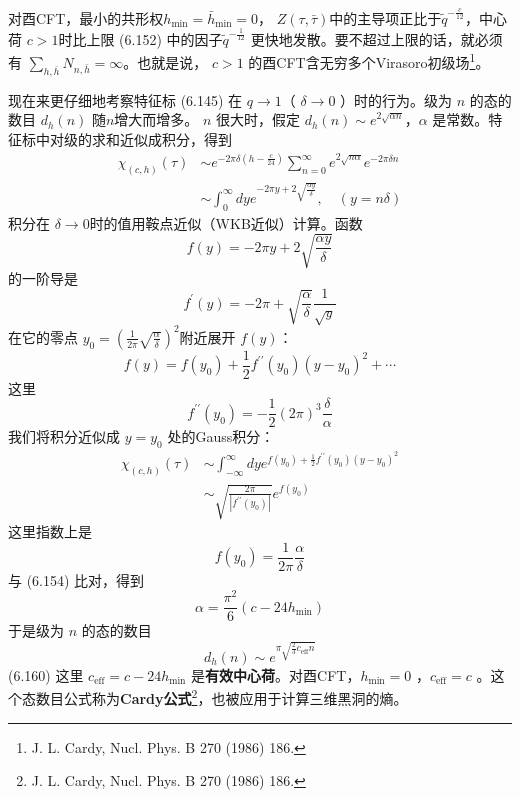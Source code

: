 对酉CFT，最小的共形权$ h_{\min }=\bar{h}_{\min }=0 $， $Z(\tau, \bar{\tau}) $中的主导项正比于$ \tilde{q}^{-\frac{c}{12}} $，中心荷 $c>1 $时比上限 (6.152) 中的因子$ \tilde{q}^{-\frac{1}{12}}$ 更快地发散。要不超过上限的话，就必须有 $\sum_{h, \bar{h}} N_{n, \bar{h}}=\infty $。也就是说， $c>1$ 的酉CFT含无穷多个Virasoro初级场\footnote{J. L. Cardy, Nucl. Phys. B 270 (1986) 186.}。

现在来更仔细地考察特征标 (6.145) 在 $q \rightarrow 1 $（ $\delta \rightarrow 0$ ）时的行为。级为 $n$ 的态的数目 $d_{h}(n)$ 随$ n $增大而增多。 $n$ 很大时，假定 $d_{h}(n) \sim e^{2 \sqrt{\alpha n}} $，$ \alpha$ 是常数。特征标中对级的求和近似成积分，得到
\begin{equation}
	\begin{aligned} \chi_{(c, h)}(\tau) & \sim e^{-2 \pi \delta\left(h-\frac{c}{24}\right)} \sum_{n=0}^{\infty} e^{2 \sqrt{n \alpha}} e^{-2 \pi \delta n} \\ & \sim \int_{0}^{\infty} d y e^{-2 \pi y+2 \sqrt{\frac{\alpha y}{\delta}}}, \quad(y=n \delta) \end{aligned}
\end{equation}
积分在 $\delta \rightarrow 0 $时的值用鞍点近似（WKB近似）计算。函数
$$
	f(y)=-2 \pi y+2 \sqrt{\frac{\alpha y}{\delta}}
$$
的一阶导是
$$
f^{\prime}(y)=-2 \pi+\sqrt{\frac{\alpha}{\delta}} \frac{1}{\sqrt{y}}
$$
在它的零点 $y_{0}=\left(\frac{1}{2 \pi} \sqrt{\frac{\alpha}{\delta}}\right)^{2} $附近展开 $f(y) $：
\begin{equation}
	f(y)=f\left(y_{0}\right)+\frac{1}{2} f^{\prime \prime}\left(y_{0}\right)\left(y-y_{0}\right)^{2}+\cdots 
\end{equation}
这里
$$
f^{\prime \prime}\left(y_{0}\right)=-\frac{1}{2}(2 \pi)^{3} \frac{\delta}{\alpha}
$$
我们将积分近似成 $y=y_0$ 处的Gauss积分：
\begin{equation}
\begin{aligned} \chi_{(c, h)}(\tau) & \sim \int_{-\infty}^{\infty} d y e^{f\left(y_{0}\right)+\frac{1}{2} f^{\prime \prime}\left(y_{0}\right)\left(y-y_{0}\right)^{2}} \\ & \sim \sqrt{\frac{2 \pi}{\left|f^{\prime \prime}\left(y_{0}\right)\right|}} e^{f\left(y_{0}\right)} \end{aligned} 
\end{equation}
这里指数上是
$$
f\left(y_{0}\right)=\frac{1}{2 \pi} \frac{\alpha}{\delta}
$$
与 (6.154) 比对，得到
\begin{equation}
	\alpha=\frac{\pi^{2}}{6}\left(c-24 h_{\min }\right) 
\end{equation}
于是级为 $n$ 的态的数目
\begin{equation}
	d_{h}(n) \sim e^{\pi \sqrt{\frac{2}{3} c_{\mathrm{eff}} n}} 
\end{equation}\quad \quad (6.160)
这里
$c_{\mathrm{eff}}=c-24 h_{\min } $
是\textbf{有效中心荷}。对酉CFT，$ h_{\min }=0$ ，$ c_{\mathrm{eff}}=c$ 。这个态数目公式称为\textbf{Cardy公式}\footnote{J. L. Cardy, Nucl. Phys. B 270 (1986) 186.}，也被应用于计算三维黑洞的熵。

